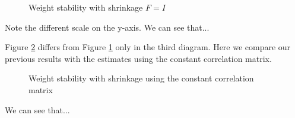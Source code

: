 \begin{figure}[H]
\caption{Weight stability with shrinkage $F=I$}
\label{fig2}
\end{figure}

Note the different scale on the y-axis. We can see that...

 
Figure \ref{fig3} differs from Figure \ref{fig2} only in the third diagram. Here we compare our previous results with the estimates using the constant correlation matrix.
\begin{figure}[H]
\caption{Weight stability with shrinkage using the constant correlation matrix}
\label{fig3}
\end{figure}

We can see that...
